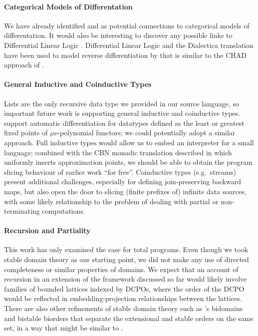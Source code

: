 \paragraph{Categorical Models of Differentation} We have already identified  and
 as potential connections to categorical models of differentation. It would also be
interesting to discover any possible links to Differential Linear Logic
\cite{ehrhard_differential_2006}. Differential Linear Logic and the Dialectica translation have been used to
model reverse differentiation by \citet{kerjean-pedrot2024} that is similar to the CHAD approach
of \citet{vakar22}.

\paragraph{General Inductive and Coinductive Types}

Lists are the only recursive data type we provided in our source language, so important future work is
supporting general inductive and coinductive types. \citet{nunes2023} support automatic differentiation for
datatypes defined as the least or greatest fixed points of $\mu\nu$-polynomial functors; we could potentially
adopt a similar approach. Full inductive types would allow us to embed an interpreter for a small language;
combined with the CBN monadic translation described in  which uniformly inserts
approximation points, we should be able to obtain the program slicing behaviour of earlier \GPS work ``for
free''. Coinductive types (e.g.~streams) present additional challenges, especially for defining
join-preserving backward maps, but also open the door to slicing (finite prefixes of) infinite data sources,
with some likely relationship to the problem of dealing with partial or non-terminating computations.

\paragraph{Recursion and Partiality} This work has only examined the case for total programs. Even though we
took stable domain theory as our starting point, we did not make any use of directed completeness or similar
properties of domains. We expect that an account of recursion in an extension of the framework discussed so
far would likely involve families of bounded lattices indexed by DCPOs, where the order of the DCPO would be
reflected in embedding-projection relationships between the lattices. There are also other refinements of
stable domain theory such as \citet{berry79}'s bidomains and \citet{laird07} bistable biorders that separate
the extensional and stable orders on the same set, in a way that might be similar to
.

